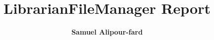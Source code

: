 \documentclass{beamer}
\title{LibrarianFileManager Report}
\author{\textbf{Samuel Alipour-fard}
}%
\institute[] %
{
MIT
\\ %
\medskip
\textit{samuelaf@mit.edu} %
}
\date{
} %
\begin{document}


{

    \begin{frame}
        \maketitle
    \end{frame}
}


\iffalse

\begin{frame}
\frametitle{Overview}

\tableofcontents
\end{frame}
\fi



\iffalse

\begin{frame}{Where were we?}

\textbf{Goals:}
\begin{itemize}
    \item
\end{itemize}

\vspace{3cm}
\end{frame}
\fi
\end{document}
